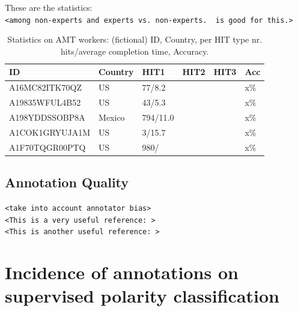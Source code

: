 \documentclass[11pt,letterpaper]{article}
\begin{document}
These are the statistics:\\
\texttt{<among non-experts and experts vs. non-experts. \cite{snow_cheap_2008} is good for this.>}

\begin{table}
\begin{scriptsize}
\begin{tabular}{|l|l|l|l|l|l|}
 \hline
 ID & Country & HIT1 & HIT2 & HIT3 & Acc \\ \hline
 A16MC82ITK70QZ & US & 77/8.2 &  &  & x\% \\
 A19835WFUL4B52 & US & 43/5.3 &  &  & x\% \\
 A198YDDSSOBP8A & Mexico & 794/11.0 &  &  & x\% \\
 A1COK1GRYUJA1M & US & 3/15.7 &  &  & x\% \\
 A1F70TQGR00PTQ & US & 980/ &  &  & x\% \\
 \hline
\end{tabular}
\end{scriptsize}
\caption{\small Statistics on AMT workers: (fictional) ID, Country, per HIT type nr. hits/average completion time, Accuracy.}
\label{table.stats}
\end{table}

\subsection{Annotation Quality}
\texttt{<take into account annotator bias>} \\
\texttt{<This is a very useful reference: \cite{dawid_maximum_1979}>} \\
\texttt{<This is another useful reference: \cite{mason_financial_2009}>}


\section{Incidence of annotations on supervised polarity classification}
\label{sect:classifier}
\end{document}
